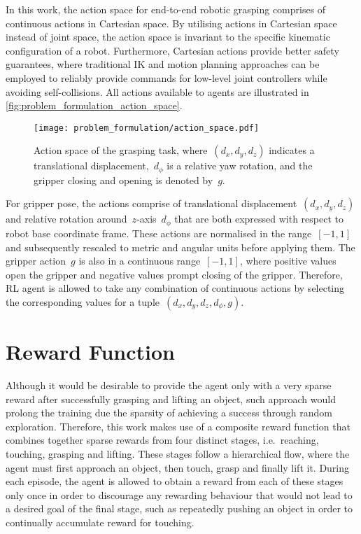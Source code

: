 In this work, the action space for end-to-end robotic grasping comprises of continuous actions in Cartesian space. By utilising actions in Cartesian space instead of joint space, the action space is invariant to the specific kinematic configuration of a robot. Furthermore, Cartesian actions provide better safety guarantees, where traditional IK and motion planning approaches can be employed to reliably provide commands for low-level joint controllers while avoiding self-collisions. All actions available to agents are illustrated in \autoref{fig:problem_formulation_action_space}.

\begin{figure}[b]
    \centering
    \texttt{[image: problem\_formulation/action\_space.pdf]}
    \caption{Action space of the grasping task, where~\((d_{x},d_{y},d_{z})\) indicates a translational displacement,~\(d_{\phi}\) is a relative yaw rotation, and the gripper closing and opening is denoted by~\(g\).}
    \label{fig:problem_formulation_action_space}
\end{figure}

For gripper pose, the actions comprise of translational displacement~\((d_{x},d_{y},d_{z})\) and relative rotation around~\(z\)-axis~\(d_{\phi}\) that are both expressed with respect to robot base coordinate frame. These actions are normalised in the range~\([-1, 1]\) and subsequently rescaled to metric and angular units before applying them. The gripper action~\(g\) is also in a continuous range~\([-1, 1]\), where positive values open the gripper and negative values prompt closing of the gripper. Therefore, RL agent is allowed to take any combination of continuous actions by selecting the corresponding values for a tuple~\((d_{x},d_{y},d_{z},d_{\phi},g)\).


\section{Reward Function}

Although it would be desirable to provide the agent only with a very sparse reward after successfully grasping and lifting an object, such approach would prolong the training due the sparsity of achieving a success through random exploration. Therefore, this work makes use of a composite reward function that combines together sparse rewards from four distinct stages, i.e.~reaching, touching, grasping and lifting. These stages follow a hierarchical flow, where the agent must first approach an object, then touch, grasp and finally lift it. During each episode, the agent is allowed to obtain a reward from each of these stages only once in order to discourage any rewarding behaviour that would not lead to a desired goal of the final stage, such as repeatedly pushing an object in order to continually accumulate reward for touching.

